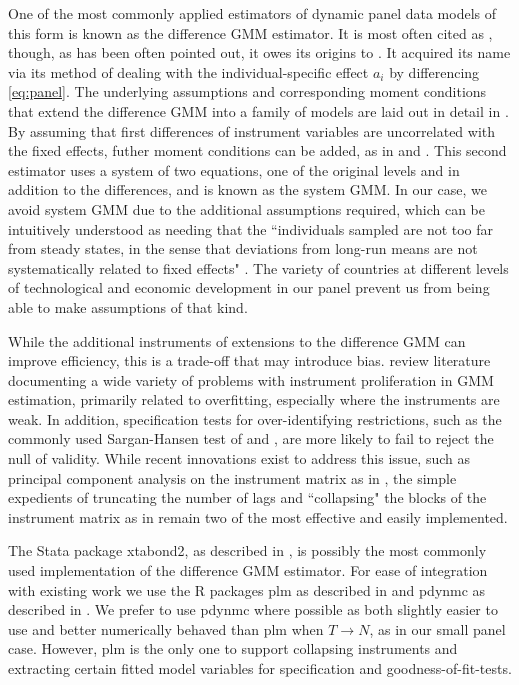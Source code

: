 \documentclass[12pt,a4paper]{article}
\newcommand{\pkg}[1]{{\fontseries{b}\selectfont #1}}
\begin{document}
One of the most commonly applied estimators of dynamic panel data models of this form is known as the difference GMM estimator.
It is most often cited as \cite{arellanoTestsSpecificationPanel1991}, though, as has been often pointed out, it owes its origins to \cite{holtz-eakinEstimatingVectorAutoregressions1988}.
It acquired its name via its method of dealing with the individual-specific effect $a_i$ by differencing \cref{eq:panel}.
The underlying assumptions and corresponding moment conditions that extend the difference GMM into a family of models are laid out in detail in \cite{fritschGMMEstimationLinear2019}.
By assuming that first differences of instrument variables are uncorrelated with the fixed effects, futher moment conditions can be added, as in \cite{arellanoAnotherLookInstrumental1995} and \cite{blundellInitialConditionsMoment1998}.
This second estimator uses a system of two equations, one of the original levels and in addition to the differences, and is known as the system GMM.
In our case, we avoid system GMM due to the additional assumptions required, which can be intuitively understood as needing that the ``individuals sampled are not too far from steady states, in the sense that deviations from long-run means are not
systematically related to fixed effects" \cite[p.128]{roodmanHowXtabond2Introduction2009}.
The variety of countries at different levels of technological and economic development in our panel prevent us from being able to make assumptions of that kind.

While the additional instruments of extensions to the difference GMM can improve efficiency, this is a trade-off that may introduce bias.
\cite{bontempiImplementingStrategyReduce2015} review literature documenting a wide variety of problems with instrument proliferation in GMM estimation, primarily related to overfitting, especially where the instruments are weak.
In addition, specification tests for over-identifying restrictions, such as the commonly used Sargan-Hansen test of \cite{sarganEstimationEconomicRelationships1958} and \cite{hansenLargeSampleProperties1982}, are more likely to fail to reject the null of validity.
While recent innovations exist to address this issue, such as principal component analysis on the instrument matrix as in \cite{bontempiImplementingStrategyReduce2015}, the simple expedients of truncating the number of lags and ``collapsing" the blocks of the instrument matrix as in \cite{roodmanNoteThemeToo2009} remain two of the most effective and easily implemented.

The Stata package \pkg{xtabond2}, as described in \cite{roodmanHowXtabond2Introduction2009}, is possibly the most commonly used implementation of the difference GMM estimator.
For ease of integration with existing work we use the R packages \pkg{plm} as described in \cite{croissantPanelDataEconometrics2008} and \pkg{pdynmc} as described in \cite{fritschPdynmcPackageEstimating2019}.
We prefer to use \pkg{pdynmc} where possible as both slightly easier to use and better numerically behaved than \pkg{plm} when $T \rightarrow N$, as in our small panel case.
However, \pkg{plm} is the only one to support collapsing instruments and extracting certain fitted model variables for specification and goodness-of-fit-tests.
\end{document}
